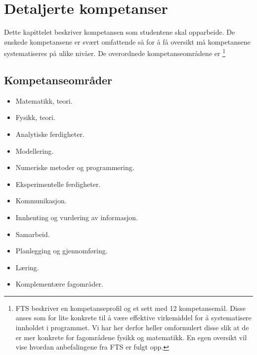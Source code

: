 \chapter{Detaljerte kompetanser}
\label{chap:competencies}
Dette kapittelet beskriver kompetansen som studentene skal opparbeide. De ønskede kompetansene er svært omfattende så for å få oversikt må kompetansene systematiseres på ulike nivåer. De overordnede kompetanseområdene er \footnote{FTS beskriver en kompetanseprofil og et sett med 12 kompetansemål. Disse anses som for lite konkrete til å være effektive virkemiddel for å systematisere innholdet i programmet. Vi har her derfor heller omformulert disse slik at de er mer konkrete for fagområdene fysikk og matematikk. En egen oversikt vil vise hvordan anbefalingene fra FTS er fulgt opp.}

\section{Kompetanseområder}

\begin{itemize}
	\item Matematikk, teori.
	\item Fysikk, teori.
	\item Analytiske ferdigheter.
	\item Modellering.
	\item Numeriske metoder og programmering.
	\item Eksperimentelle ferdigheter.
	\item Kommunikasjon.
	\item Innhenting og vurdering av informasjon.
	\item Samarbeid.
	\item Planlegging og gjennomføring.
	\item Læring.
	\item Komplementære fagområder.
\end{itemize}
